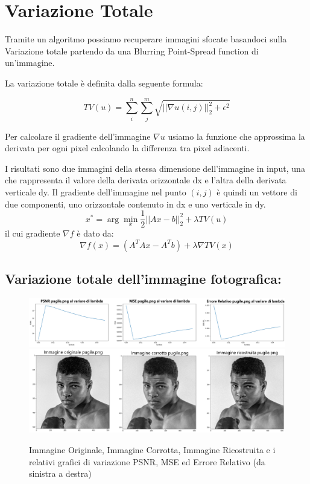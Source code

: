 \section{Variazione Totale}
Tramite un algoritmo possiamo recuperare immagini sfocate basandoci sulla Variazione totale partendo da una Blurring Point-Spread function di un'immagine. 

La variazione totale è definita dalla seguente formula:                                                                                

\[TV(u) = \sum_i^n{\sum_j^m{\sqrt{||\nabla u(i, j)||_2^2 + \epsilon^2}}}\]

Per calcolare il gradiente dell'immagine $\nabla u$ usiamo la funzione  che approssima la derivata per ogni pixel calcolando la differenza tra pixel adiacenti. 

I risultati sono due immagini della stessa dimensione dell'immagine in input, una che rappresenta il valore della derivata orizzontale dx e l'altra della derivata verticale dy. Il gradiente dell'immagine nel punto $(i, j)$ è quindi un vettore di due componenti, uno orizzontale contenuto in dx e uno verticale in dy.
\[x^* = \arg\min_x \frac{1}{2} ||Ax - b||_2^2 + \lambda TV(u)\] 
il cui gradiente $\nabla f$ è dato da: 
\[\nabla f(x) = (A^TAx - A^Tb)  + \lambda \nabla TV(x)\]

\subsection{Variazione totale dell'immagine fotografica:}
\begin{figure}[H]
    \centering
    \includegraphics[width=\textwidth]{imgRel/graficoPugile.png}
    \includegraphics[width=\textwidth]{imgRicostruzione/ricostruzionePugile_TOTVAR_maxPSNR33.70.png}
    \caption{Immagine Originale, Immagine Corrotta, Immagine Ricostruita e i relativi grafici di variazione PSNR, MSE ed Errore Relativo (da sinistra a destra)}
\end{figure}

